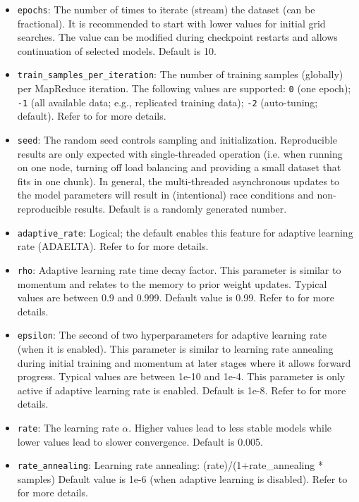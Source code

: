 \documentclass{article}[11pt]
\begin{document}
\begin{itemize}
\item \texttt{epochs}: The number of times to iterate (stream) the dataset (can be fractional). It is recommended to start with lower values for initial grid searches. The value can be modified during checkpoint restarts and allows continuation of selected models. Default is 10.
\item \texttt{train\_samples\_per\_iteration}: The number of training samples (globally) per MapReduce iteration. The following values are supported: \texttt{0} (one epoch); \texttt{-1} (all available data; e.g., replicated training data); \texttt{-2} (auto-tuning; default). Refer to  for more details.
\item \texttt{seed}: The random seed controls sampling and initialization. Reproducible results are only expected with single-threaded operation (i.e. when running on one node, turning off load balancing and providing a small dataset that fits in one chunk).  In general, the multi-threaded asynchronous updates to the model parameters will result in (intentional) race conditions and non-reproducible results.  Default is a randomly generated number.
\item \texttt{adaptive\_rate}: Logical; the default enables this feature for adaptive learning rate (ADAELTA). Refer to   for more details.
\item \texttt{rho}: Adaptive learning rate time decay factor. This parameter is similar to momentum and relates to the memory to prior weight updates. Typical values are between 0.9 and 0.999. Default value is 0.99. Refer to  for more details.
\item \texttt{epsilon}: The second of two hyperparameters for adaptive learning rate (when it is enabled). This parameter is similar to learning rate annealing during initial training and momentum at later stages where it allows forward progress. Typical values are between 1e-10 and 1e-4. This parameter is only active if adaptive learning rate is enabled. Default is 1e-8. Refer to  for more details.
\item \texttt{rate}: The learning rate $\alpha$. Higher values lead to less stable models  while lower values lead to slower convergence. Default is 0.005.  %
\item \texttt{rate\_annealing}: Learning rate annealing: (rate)/(1+rate\_annealing * samples) Default value is 1e-6 (when adaptive learning is disabled). Refer to  for more details.

\end{itemize}
\end{document}
